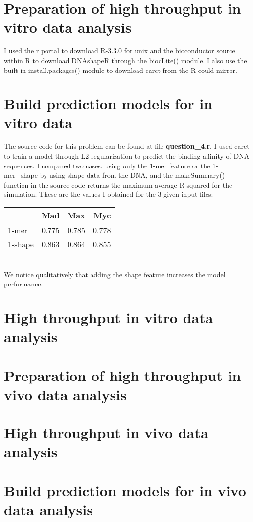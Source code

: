 \documentclass[11pt]{article}
\begin{document}
\section{Preparation of high throughput in vitro data analysis}

I used the r portal to download R-3.3.0 for unix and the bioconductor source within R to download DNAshapeR through the biocLite() module. I also use the built-in install.packages() module to download caret from the R could mirror.

\section{Build prediction models for in vitro data}

The source code for this problem can be found at file \textbf{question\_4.r}. I used caret to train a model through L2-regularization to predict the binding affinity of DNA sequences. I compared two cases: using only the 1-mer feature or the 1-mer+shape by using shape data from the DNA, and the makeSummary() function in the source code returns the maximum average R-squared for the simulation. These are the values I obtained for the 3 given input files: \\

\begin{center}
\begin{tabular}{ | l | c | c | r | }
\hline
   & Mad & Max & Myc \\
\hline
  1-mer & 0.775 & 0.785 & 0.778 \\
\hline  
  1-shape & 0.863 & 0.864 & 0.855 \\
\hline
\end{tabular}
\end{center}
\\
We notice qualitatively that adding the shape feature increases the model performance. 

\section{High throughput in vitro data analysis}
\section{Preparation of high throughput in vivo data analysis}
\section{High throughput in vivo data analysis}
\section{Build prediction models for in vivo data analysis}
\end{document}
